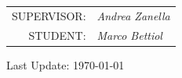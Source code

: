 \begin{titlepage}
    \begin{flushright}\vskip4.0cm 
    \begin{tabular}{rl}
            \rm\large \uppercase{Supervisor:} &\emph{Andrea Zanella}\\
	   \rm\large \uppercase{Student:} &\emph{Marco Bettiol} \\
		\end{tabular}
     \end{flushright}
    \vfill
          \begin{center}
                  \vskip1.0cm 
                  Last Update: \today  \hspace{1mm } \currenttime
           \end{center}
    
\end{titlepage}

\newpage

